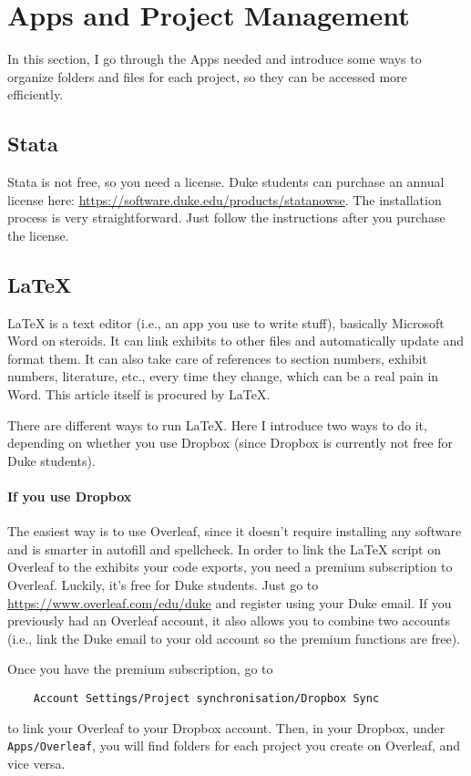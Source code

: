 \section{Apps and Project Management} 
In this section, I go through the Apps needed and introduce some ways to organize folders and files for each project, so they can be accessed more efficiently. 
\subsection{Stata}
Stata is not free, so you need a license. Duke students can purchase an annual license here: \url{https://software.duke.edu/products/statanowse}. The installation process is very straightforward. Just follow the instructions after you purchase the license. 
\subsection{\LaTeX}
{\LaTeX} is a text editor (i.e., an app you use to write stuff), basically Microsoft Word on steroids. It can link exhibits to other files and automatically update and format them. It can also take care of references to section numbers, exhibit numbers, literature, etc., every time they change, which can be a real pain in Word. This article itself is procured by \LaTeX.

There are different ways to run \LaTeX. Here I introduce two ways to do it, depending on whether you use Dropbox (since Dropbox is currently not free for Duke students).

\paragraph{If you use Dropbox}
The easiest way is to use Overleaf, since it doesn't require installing any software and is smarter in autofill and spellcheck. In order to link the {\LaTeX} script on Overleaf to the exhibits your code exports, you need a premium subscription to Overleaf. Luckily, it's free for Duke students. Just go to \url{https://www.overleaf.com/edu/duke} and register using your Duke email. If you previously had an Overleaf account, it also allows you to combine two accounts (i.e., link the Duke email to your old account so the premium functions are free). 

Once you have the premium subscription, go to 
\begin{verbatim}
    Account Settings/Project synchronisation/Dropbox Sync
\end{verbatim}
to link your Overleaf to your Dropbox account. Then, in your Dropbox, under \verb|Apps/Overleaf|, you will find folders for each project you create on Overleaf, and vice versa. 

